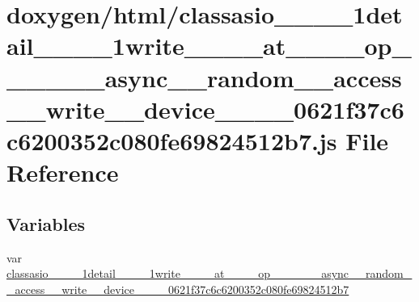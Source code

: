 \hypertarget{classasio____1____1detail____1____1write________at________op____3____01____async____random____ac8f799258a17473d56b551601566fda6b}{}\section{doxygen/html/classasio\+\_\+\+\_\+\_\+\+\_\+1detail\+\_\+\+\_\+\_\+\+\_\+1write\+\_\+\+\_\+\+\_\+\+\_\+at\+\_\+\+\_\+\+\_\+\+\_\+op\+\_\+\+\_\+\_\+\+\_\+\_\+\+\_\+async\+\_\+\+\_\+random\+\_\+\+\_\+access\+\_\+\+\_\+write\+\_\+\+\_\+device\+\_\+\+\_\+\_\+\+\_\+0621f37c6c6200352c080fe69824512b7.js File Reference}
\label{classasio____1____1detail____1____1write________at________op____3____01____async____random____ac8f799258a17473d56b551601566fda6b}
\subsection*{Variables}
\begin{DoxyCompactItemize}
\item 
var \hyperlink{classasio____1____1detail____1____1write________at________op____3____01____async____random____ac8f799258a17473d56b551601566fda6b_ace703e6b50e75a68f3066a66f3811a7c}{classasio\+\_\+\+\_\+\_\+\+\_\+1detail\+\_\+\+\_\+\_\+\+\_\+1write\+\_\+\+\_\+\+\_\+\+\_\+at\+\_\+\+\_\+\+\_\+\+\_\+op\+\_\+\+\_\+\_\+\+\_\+\_\+\+\_\+async\+\_\+\+\_\+random\+\_\+\+\_\+access\+\_\+\+\_\+write\+\_\+\+\_\+device\+\_\+\+\_\+\_\+\+\_\+0621f37c6c6200352c080fe69824512b7}
\end{DoxyCompactItemize}


